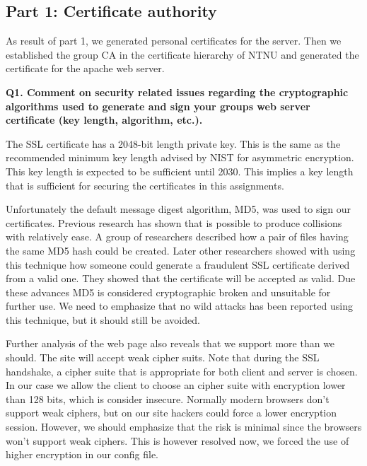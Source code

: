 
\subsection {Part 1: Certificate authority}

As result of part 1, we generated personal certificates for the server. Then we established the group CA in the certificate hierarchy of NTNU and generated the certificate for the apache web server. 
\newline

\noindent
{\bf Q1. Comment on security related issues regarding the cryptographic algorithms used to generate and sign your groups web server certificate (key length, algorithm, etc.).}
\newline

\noindent
The SSL certificate has a 2048-bit length private key. This is the same as the recommended minimum key length advised by NIST for asymmetric encryption. This key length is expected to be sufficient until 2030\cite{nisc}. This implies a key length that is sufficient for securing the certificates in this assignments. 
\newline

\noindent
Unfortunately the default message digest algorithm, MD5, was used to sign our certificates. Previous research has shown that is possible to produce collisions with relatively ease. A group of researchers described how a pair of files having the same MD5 hash could be created.\cite{md5Study} Later other researchers showed with using this technique how someone could generate a fraudulent SSL certificate derived from a valid one. They showed that the certificate will be accepted as valid. \cite{md5Harmful} Due these advances MD5 is considered cryptographic broken and unsuitable for further use. We need to emphasize that no wild attacks has been reported using this technique, but it should still be avoided.\cite {md5Wiki, md5Networking}
\newline

\noindent
Further analysis of the web page also reveals that we support more than we should. The site will accept weak cipher suits. Note that during the SSL handshake, a cipher suite that is appropriate for both client and server is chosen. In our case we allow the client to choose an cipher suite with encryption lower than 128 bits, which is consider insecure. Normally modern browsers don't support weak ciphers, but on our site hackers could force a lower encryption session. However, we should emphasize that the risk is minimal since the browsers won't support weak ciphers.\cite {cipher} This is however resolved now, we forced the use of higher encryption in our config file. 
\newline

  





